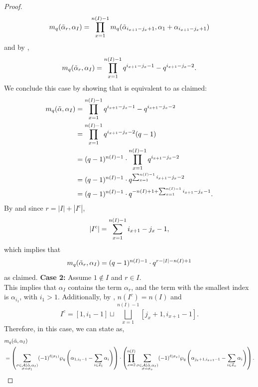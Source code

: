 \documentclass[10pt]{article}
\newcommand{\hr}[0]{\Tilde{\alpha}}
\newcommand{\newmu}[0]{\alpha_I}
\newcommand{\thealtset}[0]{\mathcal{A}(\hr,\newmu)}
\newcommand{\qpartition}[1]{\wp_q\left(#1\right)}
\begin{document}
\begin{proof}
    \begin{equation}
        m_q(\hr_r,\alpha_I) = \prod_{x=1}^{n(I)-1}m_q(\hr_{i_{x+1}-j_x+1},\alpha_1+\alpha_{i_{x+1}-j_x+1})\notag
    \end{equation}
    and by , 
    \begin{equation}
        m_q(\hr_r,\alpha_I) 
        = \prod_{x=1}^{n(I)-1} q^{i_{x+1}-j_x-1}-q^{i_{x+1}-j_x-2}.\label{big theorem case 1 ALMOST DONE}
    \end{equation}
    We conclude this case by showing that  is equivalent to  as claimed:
    \begin{align}
        m_q(\hr,\alpha_I) &= \prod_{x=1}^{n(I)-1}q^{i_{x+1}-j_x-1}-q^{i_{x+1}-j_x-2} \notag \\
        &= \prod_{x=1}^{n(I)-1}q^{i_{x+1}-j_x-2}(q-1)\notag \\
        &= (q-1)^{n(I)-1}\cdot\prod_{x=1}^{n(I)-1}q^{i_{x+1}-j_x-2}\notag \\
        &= (q-1)^{n(I)-1}\cdot q^{\sum_{x=1}^{n(I)-1}i_{x+1}-j_x-2}\notag \\
        &= (q-1)^{n(I)-1}\cdot q^{-n(I)+1+\sum_{x=1}^{n(I)-1}i_{x+1}-j_x-1}.\notag
    \end{align}
    By  and since $r=|I|+|I^c|$,
    \begin{equation}
        |I^c|=
        \sum_{x=1}^{n(I)-1}i_{x+1}-j_x-1,\notag
    \end{equation}
    which implies that
    \begin{equation}
        m_q(\hr_r,\alpha_I) = (q-1)^{n(I)-1}\cdot q^{r-|I|-n(I)+1}\notag
    \end{equation}
    as claimed. 
    \newline\noindent \textbf{Case 2:} Assume $1\notin I$ and $r\in I$. \\
    This implies that $\alpha_I$ contains the term $\alpha_r$, and the term with the smallest index is $\alpha_{i_1}$, with $i_1>1$. Additionally, by , $n(I^c)=n(I)$ and 
    \begin{equation}
        I^c = [1,i_1-1] \sqcup \bigsqcup_{x=1}^{n(I)-1}[j_x+1,i_{x+1}-1].\label{interval partition for case 2}
    \end{equation}
    Therefore, in this case, we can state  as,
    \begin{align}
        &m_q(\hr,\alpha_I) \notag\\
        &=\left(\sum_{\substack{\sigma\in\thealtset\\\sigma=\sigma_1}}(-1)^{\ell(\sigma_1)}\qpartition{\alpha_{1,i_1-1}-\sum_{i\in\mathcal{I}_1}\alpha_i}\right)\cdot \left(\prod_{x=2}^{n(I)}\sum_{\substack{\sigma\in\thealtset\\\sigma=\sigma_x}}(-1)^{\ell(\sigma_x)}\qpartition{\alpha_{j_x+1,i_{x+1}-1}-\sum_{i\in\mathcal{I}_x}\alpha_i}\right).\notag

\end{align}
\end{proof}
\end{document}
